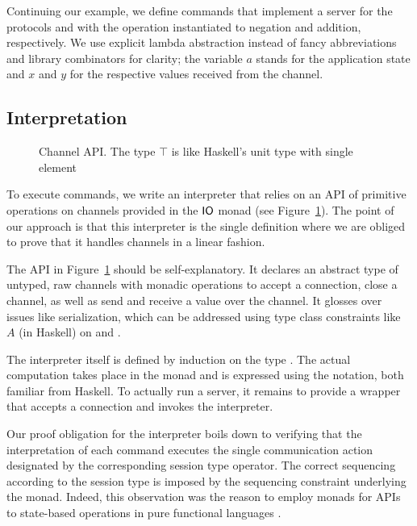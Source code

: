 \documentclass[acmsmall,screen]{acmart}
\begin{document}
Continuing our example, we define commands that implement a server
for the protocols {\Aunaryp} and {\Abinaryp} with the operation instantiated to
negation and addition, respectively.
\stNegpCommand
\stAddpCommand  
 We use explicit lambda abstraction instead of fancy abbreviations and library combinators
for clarity; the variable $a$ stands for the application state and $x$ and $y$ for
the respective values received from the channel.

\subsection{Interpretation}
\label{sec:interpretation-1}

\begin{figure}[tp]
\postulateChannel
  \caption{Channel API. The type $\top$ is like
  Haskell's unit type with single element {\Att}}
  \label{fig:channel-api}
\end{figure}
To execute commands, we write an
interpreter that relies on an API of primitive operations on channels provided
in the $\AIO$ monad (see Figure~\ref{fig:channel-api}). The point of our approach is that this
interpreter is the single definition where we are obliged to prove
that it handles channels in a linear fashion. 

The API in Figure~\ref{fig:channel-api} should be self-explanatory. It declares an abstract type of
untyped, raw channels with monadic operations to accept a connection, close a channel, as
well as send and receive a value over the channel. It glosses over issues like
serialization, which can be addressed using type class constraints like
{\ASerialize~$A$} (in Haskell) on {\AprimSend} and {\AprimRecv}.

The interpreter itself is defined by induction on the type
{\ACommand}. The actual computation takes place in the {\AIO} monad and is expressed using the {\Ado} notation, both
familiar from Haskell. 
\stExecutorSignature\vspace{-1.5\baselineskip}
\stExecutor
To actually run a server, it remains to provide a wrapper that accepts
a connection and invokes the interpreter.
\stAcceptor

Our proof obligation for the interpreter boils down to verifying that
the interpretation of each command executes the single communication
action designated by the corresponding session type operator. The
correct sequencing according to the session type is imposed by the
sequencing constraint underlying the {\AIO} monad. Indeed, this
observation was the reason to employ monads for APIs to state-based
operations in pure functional languages \cite{DBLP:conf/popl/JonesW93}.
\end{document}
